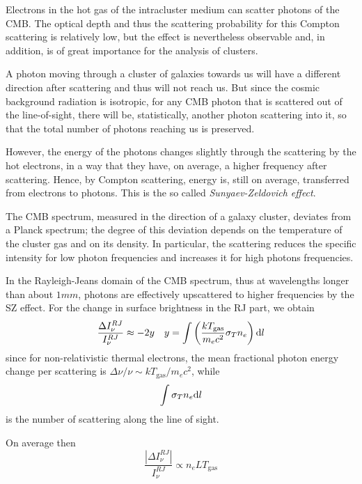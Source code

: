 Electrons in the hot gas of the intracluster medium can scatter photons of the CMB. The optical depth and thus the scattering probability for this Compton scattering is relatively low, but the effect is nevertheless observable and, in addition, is of great importance for the analysis of clusters.
\par A photon moving through a cluster of galaxies towards us will have a different direction after scattering and thus will not reach us. But since the cosmic background radiation is isotropic, for any CMB photon that is scattered out of the line-of-sight, there will be, statistically, another photon scattering into it, so that the total number of photons reaching us is preserved.
\par However, the energy of the photons changes slightly through the scattering by the hot electrons, in a way that they have, on average, a higher frequency after scattering. Hence, by Compton scattering, energy is, still on average, transferred from electrons to photons. This is the so called \emph{Sunyaev-Zeldovich effect}.
\par The CMB spectrum, measured in the direction of a galaxy cluster, deviates from a Planck spectrum; the degree of this deviation depends on the temperature of the cluster gas and on its density. In particular, the scattering reduces the specific intensity for low photon frequencies and increases it for high photons frequencies.
\par In the Rayleigh-Jeans domain of the CMB spectrum, thus at wavelengths longer than about $1\unit{mm}$, photons are effectively upscattered to higher frequencies by the SZ effect. For the change in surface brightness in the RJ part, we obtain
\begin{equation*}
    \frac{\Delta I_{\nu}^{RJ}}{I_{\nu}^{RJ}} \approx -2y \quad y = \int \left(\frac{kT_{\text{gas}}}{m_{e}c^{2}}\sigma_{T}n_{e}\right)\text{d}l
\end{equation*}
since for non-relativistic thermal electrons, the mean fractional photon energy change per scattering is $\Delta\nu/\nu \sim kT_{\text{gas}}/m_{e}c^{2}$, while
\begin{equation*}
    \int \sigma_{T}n_{e}\text{d}l
\end{equation*}
is the number of scattering along the line of sight.
\par On average then 
\begin{equation*}
     \frac{|\Delta I_{\nu}^{RJ}|}{I_{\nu}^{RJ}} \propto n_{e}LT_{\text{gas}}
\end{equation*}

